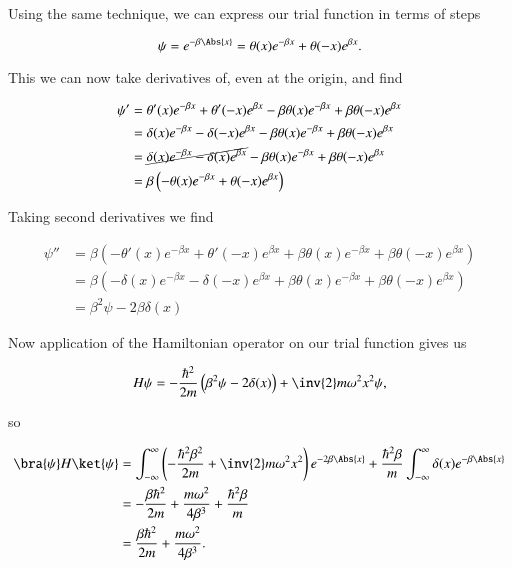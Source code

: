 Using the same technique, we can express our trial function in terms of steps

\begin{equation}\label{eqn:variationHarmonicOscillator:350}
\psi = e^{-\beta \Abs{x}} = \theta(x) e^{-\beta x} + \theta(-x) e^{\beta x}.
\end{equation}

This we can now take derivatives of, even at the origin, and find

\begin{align*}
\psi' 
&= \theta'(x) e^{-\beta x} + \theta'(-x) e^{\beta x} -\beta \theta(x) e^{-\beta x} + \beta \theta(-x) e^{\beta x} \\
&= \delta(x) e^{-\beta x} - \delta(-x) e^{\beta x} -\beta \theta(x) e^{-\beta x} + \beta \theta(-x) e^{\beta x} \\
&= \cancel{\delta(x) e^{-\beta x} - \delta(x) e^{\beta x}} -\beta \theta(x) e^{-\beta x} + \beta \theta(-x) e^{\beta x} \\
&= \beta \left( 
-\theta(x) e^{-\beta x} + \theta(-x) e^{\beta x} 
\right)
\end{align*}

Taking second derivatives we find

\begin{align*}
\psi''
&= \beta \left( 
-\theta'(x) e^{-\beta x} + \theta'(-x) e^{\beta x} 
+\beta \theta(x) e^{-\beta x} + \beta \theta(-x) e^{\beta x} 
\right) \\
&= 
\beta \left( 
-\delta(x) e^{-\beta x} - \delta(-x) e^{\beta x} 
+\beta \theta(x) e^{-\beta x} + \beta \theta(-x) e^{\beta x} 
\right) \\
&= \beta^2 \psi - 2 \beta \delta(x)
\end{align*}

Now application of the Hamiltonian operator on our trial function gives us

\begin{equation}\label{eqn:variationHarmonicOscillator:370}
H \psi = -\frac{\hbar^2}{2m} \left( \beta^2 \psi - 2 \delta(x) \right) + \inv{2} m \omega^2 x^2 \psi,
\end{equation}

so

\begin{align*}
\bra{\psi} H \ket{\psi} &= 
\int_{-\infty}^\infty 
\left( 
-\frac{\hbar^2 \beta^2}{2m} + \inv{2} m \omega^2 x^2 
\right) e^{-2 \beta \Abs{x} }
+ \frac{\hbar^2 \beta}{m}
\int_{-\infty}^\infty \delta(x)
e^{- \beta \Abs{x}} \\
&=
-\frac{\beta \hbar^2}{2m} + \frac{m \omega^2}{4 \beta^3} + \frac{\hbar^2 \beta}{m} \\
&=
\frac{\beta \hbar^2}{2m} + \frac{m \omega^2}{4 \beta^3}.
\end{align*}

